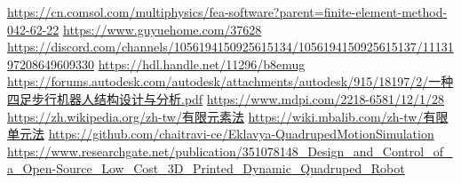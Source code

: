 \newpage
\renewcommand\bibname{參~考~文~獻}
\begin{thebibliography}{99}  %
\href{https://cn.comsol.com/multiphysics/fea-software?parent=finite-element-method-042-62-22}{https://cn.comsol.com/multiphysics/fea-software?parent=finite-element-method-042-62-22}
\href{https://www.guyuehome.com/37628}{https://www.guyuehome.com/37628}
\href{https://discord.com/channels/1056194150925615134/1056194150925615137/1113197208649609330}{https://discord.com/channels/1056194150925615134/1056194150925615137/1113197208649609330}
\href{https://hdl.handle.net/11296/b8emug}{https://hdl.handle.net/11296/b8emug}
\href{https://forums.autodesk.com/autodesk/attachments/autodesk/915/18197/2/一种四足步行机器人结构设计与分析.pdf}{https://forums.autodesk.com/autodesk/attachments/autodesk/915/18197/2/一种四足步行机器人结构设计与分析.pdf}
\href{https://www.mdpi.com/2218-6581/12/1/28}{https://www.mdpi.com/2218-6581/12/1/28}
\href{https://zh.wikipedia.org/zh-tw/有限元素法}{https://zh.wikipedia.org/zh-tw/有限元素法}
\href{https://wiki.mbalib.com/zh-tw/有限单元法}{https://wiki.mbalib.com/zh-tw/有限单元法}
\href{https://github.com/chaitravi-ce/Eklavya-QuadrupedMotionSimulation}{https://github.com/chaitravi-ce/Eklavya-QuadrupedMotionSimulation}
\href{https://www.researchgate.net/publication/351078148_Design_and_Control_of_a_Open-Source_Low_Cost_3D_Printed_Dynamic_Quadruped_Robot}{https://www.researchgate.net/publication/351078148_Design_and_Control_of_a_Open-Source_Low_Cost_3D_Printed_Dynamic_Quadruped_Robot}\label{Robot}

%
\end{thebibliography}
\newpage
